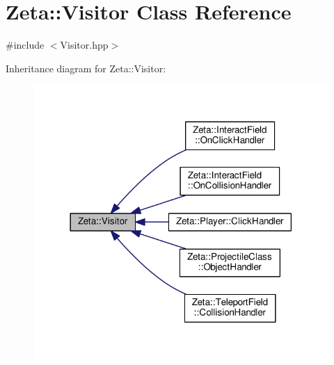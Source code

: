 \hypertarget{classZeta_1_1Visitor}{\section{Zeta\+:\+:Visitor Class Reference}
\label{classZeta_1_1Visitor}
}


{\ttfamily \#include $<$Visitor.\+hpp$>$}



Inheritance diagram for Zeta\+:\+:Visitor\+:\nopagebreak
\begin{figure}[H]
\begin{center}
\leavevmode
\includegraphics[width=318pt]{classZeta_1_1Visitor__inherit__graph}
\end{center}
\end{figure}

